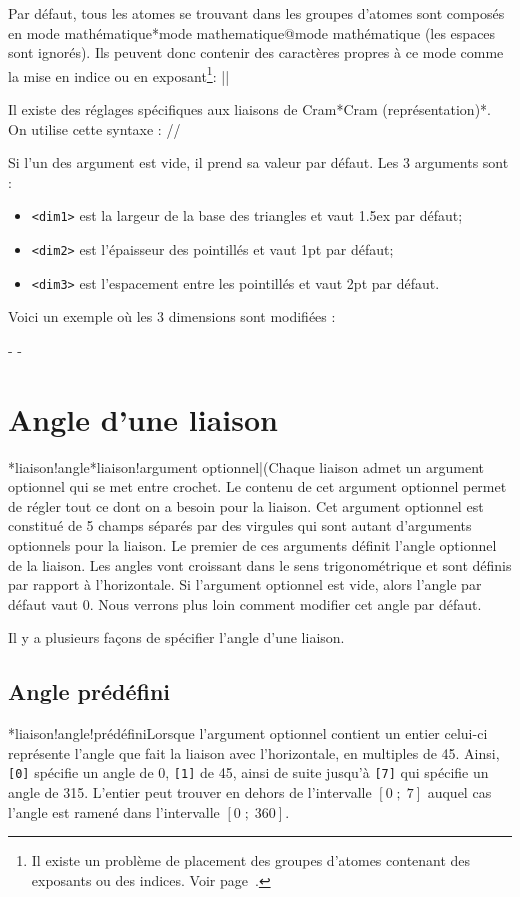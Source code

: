 \documentclass[10pt]{article}
\makeatletter
\newcommand\idx{\@ifstar{\let\print@or@not\@gobble\idx@}{\let\print@or@not\@firstofone\idx@}}
\newcommand\idx@[1]{%
	\ifcat\expandafter\noexpand\@car#1\@nil\relax%
		\expandafter\ifx\@car#1\@nil\protect
			\index{#1}%
			\print@or@not{#1}%
		\else
			\saveexpandmode\expandarg
			\StrSubstitute{\string#1}{\string @}{\@empty\protect\symbol{'100}}[\temp@]%
			\StrGobbleLeft\temp@1[\temp@]%
			\restoreexpandmode
			\expandafter\index\expandafter{\temp@ @\protect\texttt{\protect\textbackslash\temp@}}%
			\print@or@not{\texttt{\string#1}}%
		\fi
	\else
		\index{#1}%
		\print@or@not{#1}%
	\fi
}
\newcommand\make@car@active[2]{%
	\catcode`#1\active
	\begingroup
		\lccode`\~`#1\relax
		\lowercase{\endgroup\def~{#2}}%
}
\newif\if@exstar
\newcommand\exemple{%
	\begingroup
	\parskip\z@
	\@makeother\;\@makeother\!\@makeother\?\@makeother\:%
	\@ifstar{\@exstartrue\exemple@}{\@exstarfalse\exemple@}}
\newcommand\exemple@[2][65]{%
	\medbreak\noindent
	\begingroup
		\let\do\@makeother\dospecials
		\make@car@active\ { {}}%
		\make@car@active\^^M{\par\leavevmode}%
		\make@car@active\,{\leavevmode\kern\z@\string,}%
		\make@car@active\-{\leavevmode\kern\z@\string-}%
		\make@car@active\>{\leavevmode\kern\z@\string>}%
		\make@car@active\<{\leavevmode\kern\z@\string<}%
		\exemple@@{#1}{#2}%
}
\newcommand\exemple@@[3]{%
	\def\@tempa##1#3{\exemple@@@{#1}{#2}{##1}}%
	\@tempa
}
\newcommand\exemple@@@[3]{%
	\xdef\the@code{#3}%
	\endgroup
	\if@exstar
		\begingroup
			\fboxrule0.4pt
			\let\breakboxparindent\z@
			\def\bkvz@bottom{\hrule\@height\fboxrule}%
			\let\bkvz@before@breakbox\relax
			\def\bkvz@set@linewidth{\advance\linewidth\dimexpr-2\fboxrule-2\fboxsep}%
			\def\bkvz@left{\vrule\@width\fboxrule\hskip\fboxsep}%
			\def\bkvz@right{\hskip\fboxsep\vrule\@width\fboxrule}%
			\def\bkvz@top{\hbox to \hsize{%
				\vrule\@width\fboxrule\@height\fboxrule
				\leaders\bkvz@bottom\hfill
				\ECFAugie
				\fboxsep\z@
				\colorbox{black}{\kern0.25em\color{white}\footnotesize\lower0.5ex\hbox{\strut#2}\kern0.25em}%
				\leaders\bkvz@bottom\hfill
				\vrule\@width\fboxrule\@height\fboxrule}}%
			\breakbox
				\kern.5ex\relax
				\ttfamily\footnotesize\the@code\par
				\normalfont
				\kern3pt
				\hrule height0.1pt width\linewidth depth0.1pt
				\vskip5pt
				\rightskip0pt plus 1fill
				\everypar{{\color{lightgray}\rlap{\vrule height0.1pt width\linewidth depth0.1pt}}\hskip0pt plus 1fill}%
				\newlinechar`\^^M\everyeof{\noexpand}\scantokens{#3}\par
			\endbreakbox
		\endgroup
	\else
		\vskip0.5ex
		\boxput*(0,1)
			{\fboxsep\z@
			\hbox{\ECFAugie\colorbox{black}{\leavevmode\kern0.25em{\color{white}\footnotesize\strut#2}\kern0.25em}}%
			}%
			{\fboxsep5pt
			\fbox{%
				$\vcenter{\hsize\dimexpr0.#1\linewidth-\fboxsep-\fboxrule\relax
					\kern5pt\parskip0pt \ttfamily\footnotesize\the@code}%
				\vcenter{\kern5pt\hsize\dimexpr\linewidth-0.#1\linewidth-\fboxsep-\fboxrule\relax
					\everypar{{\color{lightgray}\rlap{\vrule height0.1pt width\dimexpr\linewidth-0.#1\linewidth-\fboxsep-\fboxrule depth0.1pt}}}%
					\footnotesize\newlinechar`\^^M\everyeof{\noexpand}\scantokens{#3}}$%
				}%
			}%
	\fi
	\medbreak
	\endgroup
}
\let\do\@makeother\dospecials
\makeatother
\begin{document}
Par défaut, tous les atomes se trouvant dans les groupes d'atomes sont composés en mode mathématique\idx*{mode mathematique@mode mathématique} (les espaces sont ignorés). Ils peuvent donc contenir des caractères propres à ce mode comme la mise en indice ou en exposant\footnote{Il existe un problème de placement des groupes d'atomes contenant des exposants ou des indices. Voir page~\pageref{alignement.vertical}.}:
\exemple{Mode mathématique}||

Il existe des réglages spécifiques aux liaisons de Cram\idx*{Cram (représentation)}\idx*\setcrambond. On utilise cette syntaxe :\label{setcrambond}
\centerverb//
\smallskip

Si l'un des argument est vide, il prend sa valeur par défaut. Les 3 arguments sont :
\begin{itemize}
	\item \verb-<dim1>- est la largeur de la base des triangles et vaut 1.5ex par défaut;
	\item \verb-<dim2>- est l'épaisseur des pointillés et vaut 1pt par défaut;
	\item \verb-<dim3>- est l'espacement entre les pointillés et vaut 2pt par défaut.
\end{itemize}

Voici un exemple où les 3 dimensions sont modifiées :

\exemple{Liaison de Cram modifiée}-\setcrambond{10pt}{0.4pt}{1pt}
-

\section{Angle d'une liaison}
\idx*{liaison!angle}\idx*{liaison!argument optionnel|(}Chaque liaison admet un argument optionnel qui se met entre crochet. Le contenu de cet argument optionnel permet de régler tout ce dont on a besoin pour la liaison. Cet argument optionnel est constitué de 5 champs séparés par des virgules qui sont autant d'arguments optionnels pour la liaison. Le premier de ces arguments définit l'angle optionnel de la liaison. Les angles vont croissant dans le sens trigonométrique et sont définis par rapport à l'horizontale. Si l'argument optionnel est vide, alors l'angle par défaut vaut 0\degres. Nous verrons plus loin comment modifier cet angle par défaut.

Il y a plusieurs façons de spécifier l'angle d'une liaison.
\subsection{Angle prédéfini}
\idx*{liaison!angle!prédéfini}Lorsque l'argument optionnel contient un entier celui-ci représente l'angle que fait la liaison avec l'horizontale, en multiples de 45\degres. Ainsi, \verb-[0]- spécifie un angle de 0\degres, \verb-[1]- de 45\degres, ainsi de suite jusqu'à \verb-[7]- qui spécifie un angle de 315\degres. L'entier peut trouver en dehors de l'intervalle $[0\;;\;7]$ auquel cas l'angle est ramené dans l'intervalle $[0\;;\;360]$.
\end{document}
